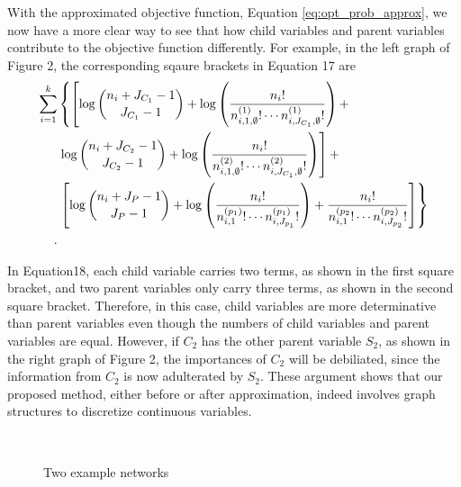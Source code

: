 With the approximated objective function, Equation \ref{eq:opt_prob_approx}, we now have a more clear way to see that how child variables and parent variables contribute to the objective function differently. For example, in the left graph of Figure 2, the corresponding sqaure brackets in Equation 17 are
\begin{equation}
\begin{aligned}
 \sum_{i=1}^k & \left\lbrace   \left[ \log{{n_{i} + J_{C_1} - 1}\choose{J_{C_1}-1}} + \log \left(  {{{n_i}!} \over { {n^{(1)}_{i,1,\emptyset} !} \cdots {n^{(1)}_{i,J_{C_1},\emptyset} !}} }  \right)  +  \right. \right.\\
& \left.  \log{{n_{i} + J_{C_2} - 1}\choose{J_{C_2}-1}} + \log \left(  {{{n_i}!} \over { {n^{(2)}_{i,1,\emptyset} !} \cdots {n^{(2)}_{i,J_{C_1},\emptyset} !}} }  \right)  \right] + \\
&  \left. \left[  \log {{n_{i} + J_P - 1}\choose{J_P-1}} +  \log \left( { {{{n}_i}!}\over{ {n^{(p_1)}_{i,1} !}\cdots {n^{(p_1)}_{i,J_{p_1}} !}}} \right) +{ {{{n}_i}!}\over{ {n^{(p_2}_{i,1} !}\cdots {n^{(p_2)}_{i,J_{p_2}} !}}}  \right] \right\rbrace\\ .
\end{aligned}
\end{equation}


In Equation18, each child variable carries two terms, as shown in the first square bracket, and two parent variables only carry three terms, as shown in the second square bracket. Therefore, in this case, child variables are more determinative than parent variables even though the numbers of child variables and parent variables are equal. However, if $C_2$ has the other parent variable $S_2$, as shown in the right graph of Figure 2, the importances of $C_2$ will be debiliated, since the information from $C_2$ is now adulterated by $S_2$. These argument shows that our proposed method, either before or after approximation, indeed involves graph structures to discretize continuous variables.

\begin{figure}[ht]
    \begin{tabular}{cc}
      
      \end{tabular}
     \hspace{5em}
      \begin{tabular}{cc}
      
    \end{tabular}
  \caption{Two example networks}
\end{figure}


